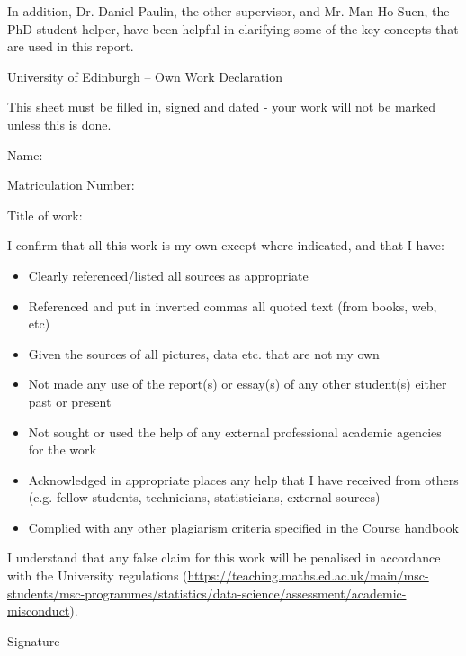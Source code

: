 \documentclass[11pt,twoside]{article}
\numberwithin{Theorem}{section}
\numberwithin{Definition}{section}
\numberwithin{Lemma}{section}
\numberwithin{Algorithm}{section}
\numberwithin{equation}{section}
\newcommand{\dottedline}[1]{\makebox[#1]{.\dotfill}}
\begin{document}
In addition, Dr. Daniel Paulin, the other supervisor, and Mr. Man Ho Suen, the PhD student helper, have been helpful in clarifying some of the key concepts that are used in this report.


\clearpage

\begin{center}
\Large{University of Edinburgh – Own Work Declaration}
\end{center}


This sheet must be filled in, signed and dated - your work will not be marked unless this is done.
\vspace{1cm}

Name: \dottedline{8cm}

Matriculation Number: \dottedline{6cm}

Title of work: \dottedline{8cm}

\vspace{1cm}

I confirm that all this work is my own except where indicated, and that I have:
\begin{itemize}
\item	Clearly referenced/listed all sources as appropriate	 				
\item	Referenced and put in inverted commas all quoted text (from books, web, etc)	
\item	Given the sources of all pictures, data etc. that are not my own				
\item	Not made any use of the report(s) or essay(s) of any other student(s) either past 	
or present	
\item	Not sought or used the help of any external professional academic agencies for the work
\item	Acknowledged in appropriate places any help that I have received from others	(e.g. fellow students, technicians, statisticians, external sources)
\item	Complied with any other plagiarism criteria specified in the Course handbook
\end{itemize}

I understand that any false claim for this work will be penalised in accordance with
the University regulations	(\url{https://teaching.maths.ed.ac.uk/main/msc-students/msc-programmes/statistics/data-science/assessment/academic-misconduct}).								

\vspace{1cm}

Signature \dottedline{8cm}
\end{document}
